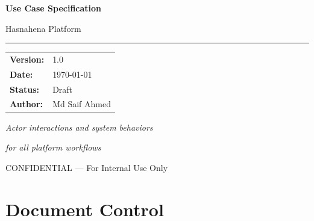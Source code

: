 \documentclass[11pt,a4paper]{article}
\newcommand{\DocumentTitle}{Use Case Specification}
\newcommand{\DocumentSubtitle}{Hasnahena Platform}
\newcommand{\DocumentVersion}{1.0}
\newcommand{\DocumentDate}{\today}
\begin{document}
\begin{titlepage}
    \centering
    \vspace*{2cm}
    
    {\Huge\bfseries\color{primaryblue}\DocumentTitle\par}
    \vspace{0.5cm}
    {\LARGE\color{darkgray}\DocumentSubtitle\par}
    
    \vspace{1.5cm}
    
    {\color{primaryblue}\rule{10cm}{2pt}\par}
    
    \vspace{2cm}
    
    \begin{tabular}{ll}
        \textbf{Version:} & \DocumentVersion \\[0.5em]
        \textbf{Date:} & \DocumentDate \\[0.5em]
        \textbf{Status:} & Draft \\[0.5em]
        \textbf{Author:} & Md Saif Ahmed \\[0.5em]
    \end{tabular}
    
    \vfill
    
    {\large\color{darkgray}\textit{Actor interactions and system behaviors}\par}
    {\large\color{darkgray}\textit{for all platform workflows}\par}
    
    \vspace{1cm}
    
    {\footnotesize\color{darkgray}CONFIDENTIAL --- For Internal Use Only\par}
\end{titlepage}

\tableofcontents
\newpage

\section*{Document Control}
\end{document}
